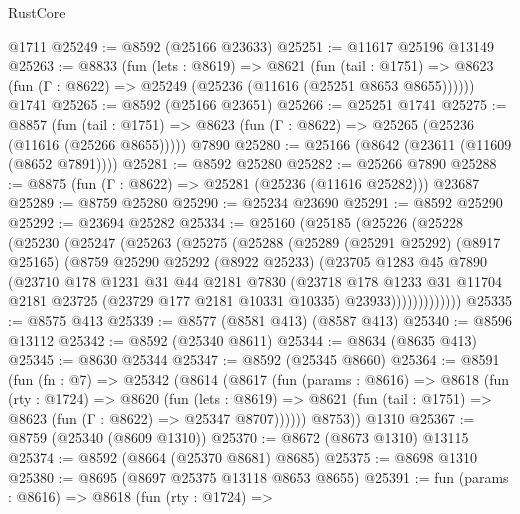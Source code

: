 \begin{lexlean}{RustCore}
\begin{coremodule}
    @1711
@25249 := @8592 (@25166 @23633)
@25251 := @11617 @25196 @13149
@25263 := @8833
    (fun (lets : @8619) =>
    @8621
      (fun (tail : @1751) =>
      @8623 (fun (Γ : @8622) => @25249 (@25236 (@11616 (@25251 @8653 @8655))))))
    @1741
@25265 := @8592 (@25166 @23651)
@25266 := @25251 @1741
@25275 := @8857
    (fun (tail : @1751) => @8623 (fun (Γ : @8622) => @25265 (@25236 (@11616 (@25266 @8655)))))
    @7890
@25280 := @25166 (@8642 (@23611 (@11609 (@8652 @7891))))
@25281 := @8592 @25280
@25282 := @25266 @7890
@25288 := @8875 (fun (Γ : @8622) => @25281 (@25236 (@11616 @25282))) @23687
@25289 := @8759 @25280
@25290 := @25234 @23690
@25291 := @8592 @25290
@25292 := @23694 @25282
@25334 := @25160
    (@25185
      (@25226
        (@25228
          (@25230
            (@25247
              (@25263
                (@25275
                  (@25288
                    (@25289
                      (@25291 @25292)
                      (@8917 @25165)
                      (@8759
                        @25290
                        @25292
                        (@8922 @25233)
                        (@23705
                          @1283
                          @45
                          @7890
                          (@23710
                            @178
                            @1231
                            @31
                            @44
                            @2181
                            @7830
                            (@23718
                              @178
                              @1233
                              @31
                              @11704
                              @2181
                              @23725
                              (@23729 @177 @2181 @10331 @10335)
                              @23933)))))))))))))
@25335 := @8575 @413
@25339 := @8577 (@8581 @413) (@8587 @413)
@25340 := @8596 @13112
@25342 := @8592 (@25340 @8611)
@25344 := @8634 (@8635 @413)
@25345 := @8630 @25344
@25347 := @8592 (@25345 @8660)
@25364 := @8591
    (fun (fn : @7) =>
    @25342
      (@8614
        (@8617
          (fun (params : @8616) =>
          @8618
            (fun (rty : @1724) =>
            @8620
              (fun (lets : @8619) =>
              @8621 (fun (tail : @1751) => @8623 (fun (Γ : @8622) => @25347 @8707))))))
        @8753))
    @1310
@25367 := @8759 (@25340 (@8609 @1310))
@25370 := @8672 (@8673 @1310) @13115
@25374 := @8592 (@8664 (@25370 @8681) @8685)
@25375 := @8698 @1310
@25380 := @8695 (@8697 @25375 @13118 @8653 @8655)
@25391 := fun (params : @8616) =>
  @8618
    (fun (rty : @1724) =>

\end{coremodule}
\end{lexlean}
